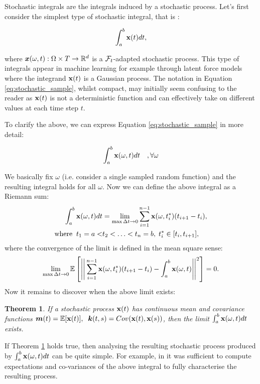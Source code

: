 \documentclass[a4paper,12pt,twoside,openright]{report}
\newtheorem{theorem}{Theorem}
\theoremstyle{definition}
\begin{document}
Stochastic integrals are the integrals induced by a stochastic process. Let's first consider the simplest type of stochastic integral, that is :

\begin{align} \label{eq:stochastic_sample}
    \int_{a}^{b} {\mathbf{x}}(t) dt,
\end{align}

where ${\bm{x}}(\omega, t): \Omega \times T \rightarrow {\mathbb{R}}^d$ is a ${\mathcal{F}}_t$-adapted stochastic process. This type of integrals appear in machine learning for example through latent force models \cite{alvarez2009latent,alvarez2013linear} where the integrand ${\mathbf{x}}(t)$ is a Gaussian process. The notation in Equation \ref{eq:stochastic_sample}, whilst compact, may initially seem confusing to the reader as ${\mathbf{x}}(t)$ is not a deterministic function and can effectively take on different values at each time step $t$.

To clarify the above, we can express  Equation \ref{eq:stochastic_sample} in more detail:

\begin{align*}
    \int_{a}^{b} {\mathbf{x}}(\omega, t) dt \quad, \forall \omega
\end{align*}

We basically fix $\omega$ (i.e. consider a single sampled random function) and the resulting integral holds for all $\omega$.  Now we can define the above integral as a Riemann sum:
\begin{align*}
    \int_{a}^{b} {\mathbf{x}}(\omega, t) dt &= \lim_{ \max \Delta t \rightarrow 0} \sum_{i=1}^{n-1} {\mathbf{x}}(\omega, t_i^{*}) (t_{i+1} - t_i), \\
    \text{where} \;\; t_1 = a < &t_2 < \hdots < t_n = b, \;  t_i^{*} \in [ t_i, t_{i+1}],
\end{align*}
where the convergence of the limit is defined in the mean square sense:
\begin{align*}
    \lim_{\max \Delta t \rightarrow 0} \mathbb{E} \left[ \Bigg|\Bigg|\sum_{i=1}^{n-1} {\mathbf{x}}(\omega, t_i^{*}) (t_{i+1} - t_i)-  \int_{a}^{b} {\mathbf{x}}(\omega, t) \Bigg|\Bigg|^2\right] =  0.
\end{align*}
Now it remains to discover when the above limit exists:
\begin{theorem}\label{thrm:ito_simple}
  If a stochastic process ${\mathbf{x}}(t)$ has continuous mean and covariance functions ${\bm{m}}(t) = \mathbb{E}[{\mathbf{x}}(t)],\;\; {\bm{k}}(t, s) = Cov({\mathbf{x}}(t), {\mathbf{x}}(s))$, then the limit $\int_{a}^{b} {\mathbf{x}}(\omega, t) dt$ exists.
\end{theorem}
If Theorem \ref{thrm:ito_simple} holds true, then analysing the resulting stochastic process produced by $\int_{a}^{b} {\mathbf{x}}(\omega, t) dt$ can be quite simple. For example, in \cite{alvarez2009latent} it was sufficient to compute expectations and co-variances of the above integral to fully characterise the resulting process.
 
\end{document}
